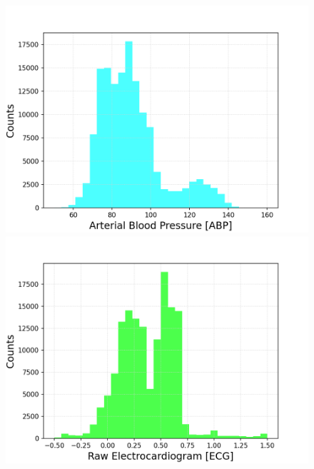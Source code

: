 \documentclass{article}
\begin{document}
\begin{figure}[h!]
	\centering
	\begin{minipage}[b]{0.32\textwidth}
		\includegraphics[width=\textwidth]{plots/histo_ABP.png}

	\end{minipage}
	\begin{minipage}[b]{0.32\textwidth}
		\includegraphics[width=\textwidth]{plots/histo_ECG.png}


\end{minipage}
\end{figure}
\end{document}
